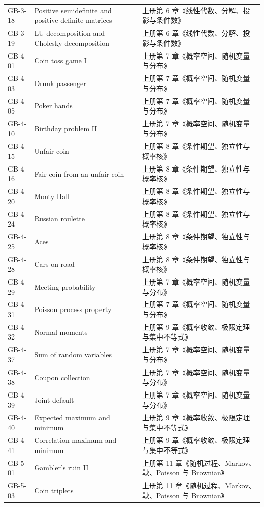 \begin{longtable}{p{}p{}p{}}
GB-3-18 & Positive semidefinite and positive definite matrices & 上册第 6 章《线性代数、分解、投影与条件数》 \\
GB-3-19 & LU decomposition and Cholesky decomposition & 上册第 6 章《线性代数、分解、投影与条件数》 \\
GB-4-01 & Coin toss game I & 上册第 7 章《概率空间、随机变量与分布》 \\
GB-4-03 & Drunk passenger & 上册第 7 章《概率空间、随机变量与分布》 \\
GB-4-05 & Poker hands & 上册第 7 章《概率空间、随机变量与分布》 \\
GB-4-10 & Birthday problem II & 上册第 7 章《概率空间、随机变量与分布》 \\
GB-4-15 & Unfair coin & 上册第 8 章《条件期望、独立性与概率核》 \\
GB-4-16 & Fair coin from an unfair coin & 上册第 8 章《条件期望、独立性与概率核》 \\
GB-4-20 & Monty Hall & 上册第 8 章《条件期望、独立性与概率核》 \\
GB-4-24 & Russian roulette & 上册第 8 章《条件期望、独立性与概率核》 \\
GB-4-25 & Aces & 上册第 8 章《条件期望、独立性与概率核》 \\
GB-4-28 & Cars on road & 上册第 8 章《条件期望、独立性与概率核》 \\
GB-4-29 & Meeting probability & 上册第 7 章《概率空间、随机变量与分布》 \\
GB-4-31 & Poisson process property & 上册第 7 章《概率空间、随机变量与分布》 \\
GB-4-32 & Normal moments & 上册第 9 章《概率收敛、极限定理与集中不等式》 \\
GB-4-37 & Sum of random variables & 上册第 7 章《概率空间、随机变量与分布》 \\
GB-4-38 & Coupon collection & 上册第 7 章《概率空间、随机变量与分布》 \\
GB-4-39 & Joint default & 上册第 7 章《概率空间、随机变量与分布》 \\
GB-4-40 & Expected maximum and minimum & 上册第 9 章《概率收敛、极限定理与集中不等式》 \\
GB-4-41 & Correlation maximum and minimum & 上册第 9 章《概率收敛、极限定理与集中不等式》 \\
GB-5-01 & Gambler's ruin II & 上册第 11 章《随机过程、Markov、鞅、Poisson 与 Brownian》 \\
GB-5-03 & Coin triplets & 上册第 11 章《随机过程、Markov、鞅、Poisson 与 Brownian》 \\

\end{longtable}
